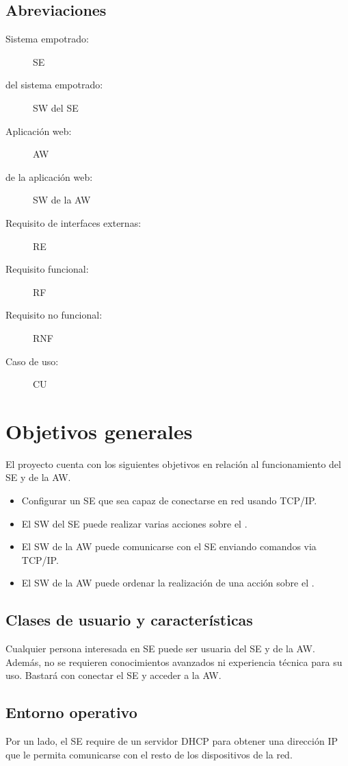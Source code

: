 \subsection{Abreviaciones} \label{sec:spec-abreviaciones}
\begin{description}
  \item[Sistema empotrado:] SE
  \item[ del sistema empotrado:] SW del SE
  \item[Aplicación web:] AW
  \item[ de la aplicación web:] SW de la AW
  \item[Requisito de interfaces externas:] RE 
  \item[Requisito funcional:] RF
  \item[Requisito no funcional:] RNF
  \item[Caso de uso:] CU
\end{description}

\section{Objetivos generales}
El proyecto cuenta con los siguientes objetivos en relación al funcionamiento
del SE y de la AW.

\begin{itemize}
  \item Configurar un SE que sea capaz de conectarse en red usando TCP/IP.
  \item El SW del SE puede realizar varias acciones sobre el
        .
  \item El SW de la AW puede comunicarse con el SE enviando comandos via TCP/IP.
  \item El SW de la AW puede ordenar la realización de una acción sobre el
        .
\end{itemize}

\subsection{Clases de usuario y características} \label{sec:spec-usuarios}
Cualquier persona interesada en SE puede ser usuaria del SE y de la AW.
Además, no se requieren conocimientos avanzados ni experiencia técnica
para su uso. Bastará con conectar el SE y acceder a la AW.

\subsection{Entorno operativo} \label{sec:spec-entorno}
Por un lado, el SE require de un servidor DHCP para obtener una dirección IP
que le permita comunicarse con el resto de los dispositivos de la red.

